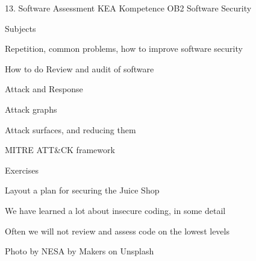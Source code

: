 \documentclass[Screen16to9,17pt]{foils}
\begin{document}
\mytitlepage
{13. Software Assessment}
{KEA Kompetence OB2 Software Security}


\begin{list1}
\item Subjects
\begin{list2}
\item Repetition, common problems, how to improve software security
\item How to do Review and audit of software
\item Attack and Response
\item Attack graphs
\item Attack surfaces, and reducing them
\item MITRE ATT\&CK framework
\end{list2}
\item Exercises
\begin{list2}
\item Layout a plan for securing the Juice Shop
\end{list2}
\end{list1}






\begin{list1}
\item We have learned a lot about insecure coding, in some detail
\item Often we will not review and assess code on the lowest levels
\end{list1}

\hfill {\small Photo by NESA by Makers on Unsplash}
\end{document}
